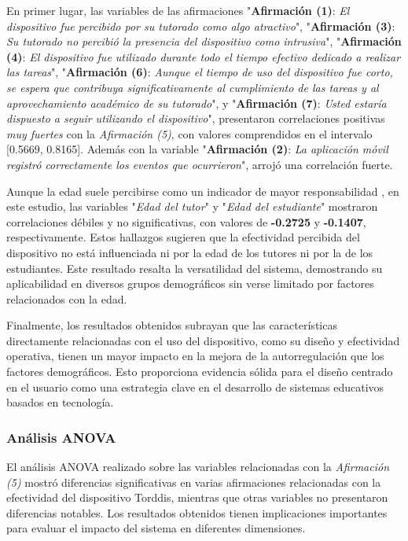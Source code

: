 				En primer lugar, las variables de las afirmaciones "\textbf{Afirmación (1)}: \textit{El dispositivo fue percibido por su tutorado como algo atractivo}", "\textbf{Afirmación (3)}: \textit{Su tutorado no percibió la presencia del dispositivo como intrusiva}", "\textbf{Afirmación (4)}: \textit{El dispositivo fue utilizado durante todo el tiempo efectivo dedicado a realizar las tareas}", "\textbf{Afirmación (6)}: \textit{Aunque el tiempo de uso del dispositivo fue corto, se espera que contribuya significativamente al cumplimiento de las tareas y al aprovechamiento académico de su tutorado}", y "\textbf{Afirmación (7)}: \textit{Usted estaría dispuesto a seguir utilizando el dispositivo}", presentaron correlaciones positivas \textit{muy fuertes} con la \textit{Afirmación (5)}, con valores comprendidos en el intervalo [0.5669, 0.8165]. Además con la variable "\textbf{Afirmación (2)}: \textit{La aplicación móvil registró correctamente los eventos que ocurrieron}", arrojó una correlación fuerte.
				
				Aunque la edad suele percibirse como un indicador de mayor responsabilidad \citep{Moss2018Why}, en este estudio, las variables "\textit{Edad del tutor}" y "\textit{Edad del estudiante}" mostraron correlaciones débiles y no significativas, con valores de \textbf{-0.2725} y \textbf{-0.1407}, respectivamente. Estos hallazgos sugieren que la efectividad percibida del dispositivo no está influenciada ni por la edad de los tutores ni por la de los estudiantes. Este resultado resalta la versatilidad del sistema, demostrando su aplicabilidad en diversos grupos demográficos sin verse limitado por factores relacionados con la edad.
				
				Finalmente, los resultados obtenidos subrayan que las características directamente relacionadas con el uso del dispositivo, como su diseño y efectividad operativa, tienen un mayor impacto en la mejora de la autorregulación que los factores demográficos. Esto proporciona evidencia sólida para el diseño centrado en el usuario como una estrategia clave en el desarrollo de sistemas educativos basados en tecnología.
			
			\subsubsection{Análisis ANOVA}
				El análisis ANOVA realizado sobre las variables relacionadas con la \textit{Afirmación (5)} mostró diferencias significativas en varias afirmaciones relacionadas con la efectividad del dispositivo Torddis, mientras que otras variables no presentaron diferencias notables. Los resultados obtenidos tienen implicaciones importantes para evaluar el impacto del sistema en diferentes dimensiones.
				
